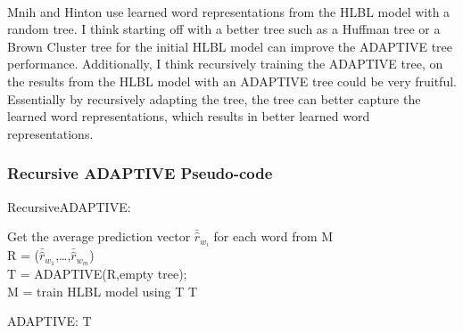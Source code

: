 \paragraph{}
Mnih and Hinton use learned word representations from the HLBL model with a random tree. I think starting off with a better tree such as a Huffman tree or a Brown Cluster tree for the initial HLBL model can improve the ADAPTIVE tree performance. Additionally, I think recursively training the ADAPTIVE tree, on the results from the HLBL model with an ADAPTIVE tree could be very fruitful. Essentially by recursively adapting the tree, the tree can better capture the learned word representations, which results in better learned word representations. 
\subsubsection{Recursive ADAPTIVE Pseudo-code}

\begin{algorithm}
\SetAlgoLined
RecursiveADAPTIVE: \\

 {
 	Get the average prediction vector $\bar{\hat{r}}_{w_i}$ for each word from M
 	\\R = ($\bar{\hat{r}}_{w_1}$,\dots,$\bar{\hat{r}}_{w_m}$)
	\\T = ADAPTIVE(R,empty tree);
	\\M = train HLBL model using T
}
\Return T
\end{algorithm}

\begin{algorithm}
\SetAlgoLined
ADAPTIVE:
\Return T
\end{algorithm}

